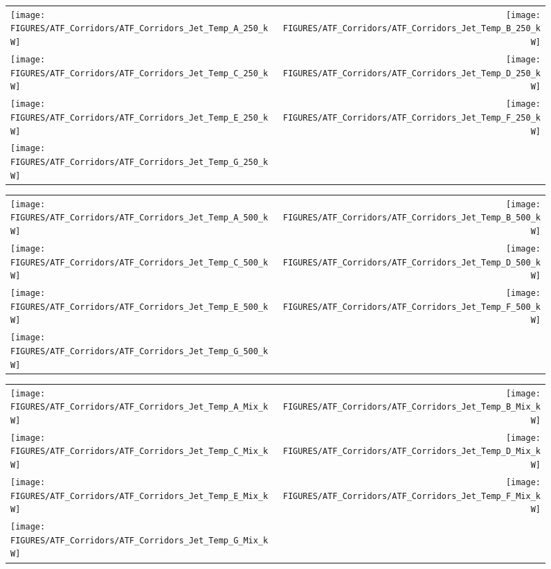 \begin{figure}[p]
\begin{tabular*}{\textwidth}{l@{\extracolsep{\fill}}r}
\texttt{[image: FIGURES/ATF\_Corridors/ATF\_Corridors\_Jet\_Temp\_A\_250\_kW]} &
\texttt{[image: FIGURES/ATF\_Corridors/ATF\_Corridors\_Jet\_Temp\_B\_250\_kW]} \\
\texttt{[image: FIGURES/ATF\_Corridors/ATF\_Corridors\_Jet\_Temp\_C\_250\_kW]} &
\texttt{[image: FIGURES/ATF\_Corridors/ATF\_Corridors\_Jet\_Temp\_D\_250\_kW]} \\
\texttt{[image: FIGURES/ATF\_Corridors/ATF\_Corridors\_Jet\_Temp\_E\_250\_kW]} &
\texttt{[image: FIGURES/ATF\_Corridors/ATF\_Corridors\_Jet\_Temp\_F\_250\_kW]} \\
\texttt{[image: FIGURES/ATF\_Corridors/ATF\_Corridors\_Jet\_Temp\_G\_250\_kW]} &
\end{tabular*}
\label{ATF_Corridors_Jet_Temp_250_kW}
\end{figure}

\begin{figure}[p]
\begin{tabular*}{\textwidth}{l@{\extracolsep{\fill}}r}
\texttt{[image: FIGURES/ATF\_Corridors/ATF\_Corridors\_Jet\_Temp\_A\_500\_kW]} &
\texttt{[image: FIGURES/ATF\_Corridors/ATF\_Corridors\_Jet\_Temp\_B\_500\_kW]} \\
\texttt{[image: FIGURES/ATF\_Corridors/ATF\_Corridors\_Jet\_Temp\_C\_500\_kW]} &
\texttt{[image: FIGURES/ATF\_Corridors/ATF\_Corridors\_Jet\_Temp\_D\_500\_kW]} \\
\texttt{[image: FIGURES/ATF\_Corridors/ATF\_Corridors\_Jet\_Temp\_E\_500\_kW]} &
\texttt{[image: FIGURES/ATF\_Corridors/ATF\_Corridors\_Jet\_Temp\_F\_500\_kW]} \\
\texttt{[image: FIGURES/ATF\_Corridors/ATF\_Corridors\_Jet\_Temp\_G\_500\_kW]} &
\end{tabular*}
\label{ATF_Corridors_Jet_Temp_500_kW}
\end{figure}

\begin{figure}[p]
\begin{tabular*}{\textwidth}{l@{\extracolsep{\fill}}r}
\texttt{[image: FIGURES/ATF\_Corridors/ATF\_Corridors\_Jet\_Temp\_A\_Mix\_kW]} &
\texttt{[image: FIGURES/ATF\_Corridors/ATF\_Corridors\_Jet\_Temp\_B\_Mix\_kW]} \\
\texttt{[image: FIGURES/ATF\_Corridors/ATF\_Corridors\_Jet\_Temp\_C\_Mix\_kW]} &
\texttt{[image: FIGURES/ATF\_Corridors/ATF\_Corridors\_Jet\_Temp\_D\_Mix\_kW]} \\
\texttt{[image: FIGURES/ATF\_Corridors/ATF\_Corridors\_Jet\_Temp\_E\_Mix\_kW]} &
\texttt{[image: FIGURES/ATF\_Corridors/ATF\_Corridors\_Jet\_Temp\_F\_Mix\_kW]} \\
\texttt{[image: FIGURES/ATF\_Corridors/ATF\_Corridors\_Jet\_Temp\_G\_Mix\_kW]} &
\end{tabular*}
\label{ATF_Corridors_Jet_Temp_Mix_kW}
\end{figure}





